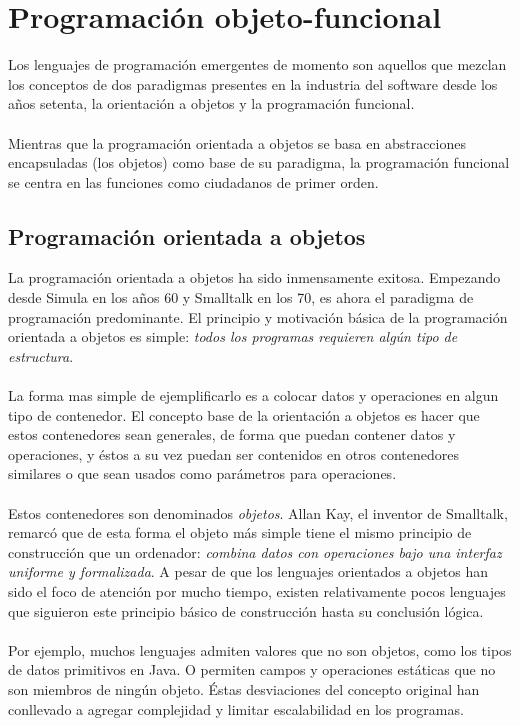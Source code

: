 \chapter{Programaci\'on objeto-funcional}
  Los lenguajes de programaci\'on emergentes de momento son aquellos
  que mezclan los conceptos de dos paradigmas presentes en la
  industria del software desde los a\~nos setenta, la orientaci\'on a
  objetos y la programaci\'on funcional.
\\
\\
  Mientras que la programaci\'on orientada a objetos se basa en
  abstracciones encapsuladas (los objetos) como base de su paradigma,
  la programaci\'on funcional se centra en las funciones como
  ciudadanos de primer orden.

\section{Programaci\'on orientada a objetos}

  La programaci\'on orientada a objetos ha sido inmensamente exitosa. 
  Empezando desde Simula en los a\~nos 60 y Smalltalk en los 70, es ahora el
  paradigma de programaci\'on predominante. El principio y
  motivaci\'on b\'asica de la programaci\'on orientada a objetos es
  simple: \emph{todos los programas requieren alg\'un tipo de
    estructura}\citep{programmingScala}.
\\
\\
  La forma mas simple de ejemplificarlo es a colocar datos y
  operaciones en algun tipo de contenedor. El concepto base de la
  orientaci\'on a objetos es hacer que estos contenedores sean
  generales, de forma que puedan contener datos y operaciones, y
  \'estos a su vez puedan ser contenidos en otros contenedores
  similares o que sean usados como par\'ametros para operaciones.
\\
\\
  Estos contenedores son denominados \emph{objetos}. Allan Kay, el
  inventor de Smalltalk, remarc\'o que de esta forma el objeto m\'as
  simple tiene el mismo principio de construcci\'on que un ordenador:
  \emph{combina datos con operaciones bajo una interfaz uniforme y
    formalizada}.  A pesar de que los lenguajes orientados a objetos
  han sido el foco de atenci\'on por mucho tiempo, existen
  relativamente pocos lenguajes que siguieron este principio b\'asico
  de construcci\'on hasta su conclusi\'on l\'ogica. 
\\
\\
  Por ejemplo,
  muchos lenguajes admiten valores que no son objetos, como los tipos
  de datos primitivos en Java. O permiten campos y operaciones
  est\'aticas que no son miembros de ning\'un objeto. \'Estas
  desviaciones del concepto original han conllevado a agregar
  complejidad y limitar escalabilidad en los
  programas\citep{programmingScala}.


